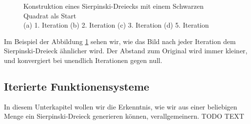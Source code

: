 \begin{figure}
	\label{ifs:sierpconst}
	\centering
	\caption{Konstruktion eines Sierpinski-Dreiecks mit einem Schwarzen Quadrat als Start\\
		(a) 1. Iteration (b) 2. Iteration (c) 3. Iteration (d) 5. Iteration}
\end{figure}
Im Beispiel der Abbildung \ref{ifs:sierpconst} sehen wir, wie das Bild nach jeder Iteration dem Sierpinski-Dreieck ähnlicher wird.
Der Abstand zum Original wird immer kleiner, und konvergiert bei unendlich Iterationen gegen null.

\subsection{Iterierte Funktionensysteme
\label{ifs:subsection:bonorum}}
In diesem Unterkapitel wollen wir die Erkenntnis, wie wir aus einer beliebigen Menge ein Sierpinski-Dreieck generieren können, verallgemeinern.
TODO TEXT

